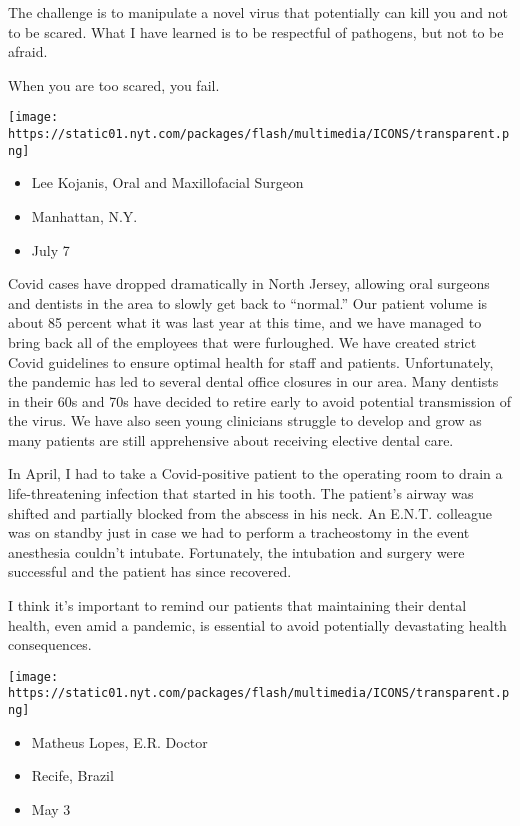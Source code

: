 The challenge is to manipulate a novel virus that potentially can kill
you and not to be scared. What I have learned is to be respectful of
pathogens, but not to be afraid.

When you are too scared, you fail.

\texttt{[image: https://static01.nyt.com/packages/flash/multimedia/ICONS/transparent.png]}

\begin{itemize}
\tightlist
\item
  Lee Kojanis, Oral and Maxillofacial Surgeon
\item
  Manhattan, N.Y.
\item
  July 7
\end{itemize}

Covid cases have dropped dramatically in North Jersey, allowing oral
surgeons and dentists in the area to slowly get back to ``normal.'' Our
patient volume is about 85 percent what it was last year at this time,
and we have managed to bring back all of the employees that were
furloughed. We have created strict Covid guidelines to ensure optimal
health for staff and patients. Unfortunately, the pandemic has led to
several dental office closures in our area. Many dentists in their 60s
and 70s have decided to retire early to avoid potential transmission of
the virus. We have also seen young clinicians struggle to develop and
grow as many patients are still apprehensive about receiving elective
dental care.

In April, I had to take a Covid-positive patient to the operating room
to drain a life-threatening infection that started in his tooth. The
patient's airway was shifted and partially blocked from the abscess in
his neck. An E.N.T. colleague was on standby just in case we had to
perform a tracheostomy in the event anesthesia couldn't intubate.
Fortunately, the intubation and surgery were successful and the patient
has since recovered.

I think it's important to remind our patients that maintaining their
dental health, even amid a pandemic, is essential to avoid potentially
devastating health consequences.

\texttt{[image: https://static01.nyt.com/packages/flash/multimedia/ICONS/transparent.png]}

\begin{itemize}
\tightlist
\item
  Matheus Lopes, E.R. Doctor
\item
  Recife, Brazil
\item
  May 3
\end{itemize}

